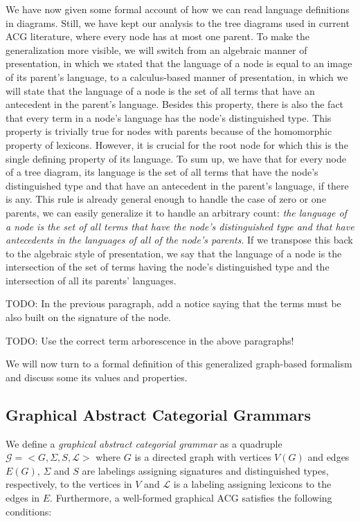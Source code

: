 We have now given some formal account of how we can read language
definitions in diagrams. Still, we have kept our analysis to the tree
diagrams used in current ACG literature, where every node has at most
one parent. To make the generalization more visible, we will switch from
an algebraic manner of presentation, in which we stated that the
language of a node is equal to an image of its parent's language, to a
calculus-based manner of presentation, in which we will state that the
language of a node is the set of all terms that have an antecedent in
the parent's language. Besides this property, there is also the fact
that every term in a node's language has the node's distinguished
type. This property is trivially true for nodes with parents because of
the homomorphic property of lexicons. However, it is crucial for the
root node for which this is the single defining property of its
language. To sum up, we have that for every node of a tree diagram, its
language is the set of all terms that have the node's distinguished type
and that have an antecedent in the parent's language, if there is
any. This rule is already general enough to handle the case of zero or
one parents, we can easily generalize it to handle an arbitrary count:
\emph{the language of a node is the set of all terms that have the
  node's distinguished type and that have antecedents in the languages
  of all of the node's parents}. If we transpose this back to the
algebraic style of presentation, we say that the language of a node is
the intersection of the set of terms having the node's distinguished
type and the intersection of all its parents' languages.

TODO: In the previous paragraph, add a notice saying that the terms must
be also built on the signature of the node.

TODO: Use the correct term arborescence in the above paragraphs!

We will now turn to a formal definition of this generalized graph-based
formalism and discuss some its values and properties.

\subsection{Graphical Abstract Categorial Grammars}

We define a \emph{graphical abstract categorial grammar} as a quadruple
$\mathcal{G} = \mathopen{<} G, \Sigma, S, {\mathcal{L}} \mathclose{>}$
where $G$ is a directed graph with vertices $V(G)$ and edges $E(G)$,
$\Sigma$ and $S$ are labelings assigning signatures and distinguished
types, respectively, to the vertices in $V$ and ${\mathcal{L}}$ is a
labeling assigning lexicons to the edges in $E$. Furthermore, a
well-formed graphical ACG satisfies the following conditions:

